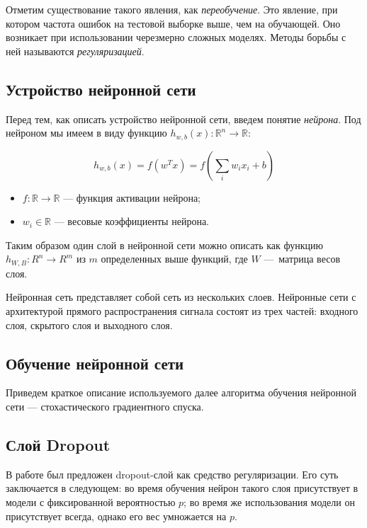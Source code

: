 \documentclass[14pt, a4paper]{extarticle}
\begin{document}
Отметим существование такого явления, как \textit{переобучение}. Это явление, при котором частота ошибок на тестовой выборке выше, чем на обучающей. Оно возникает при использовании черезмерно сложных моделях. Методы борьбы с ней называются \textit{регуляризацией}.

\subsection{Устройство нейронной сети}

Перед тем, как описать устройство нейронной сети, введем понятие \textit{нейрона}. Под нейроном мы имеем в виду функцию $h_{w, b}(x): \mathbb{R}^{n} \rightarrow \mathbb{R}$:

\begin{equation*}
	h_{w, b}(x) = f(w^Tx) = f(\sum_i w_ix_i + b)
\end{equation*}
\begin{itemize}
\item $f: \mathbb{R} \rightarrow \mathbb{R} $ — функция активации нейрона;
\item $w_i \in \mathbb{R} $ — весовые коэффициенты нейрона.
\end{itemize}

Таким образом один слой в нейронной сети можно описать как функцию $h_{W, B}: R^n \rightarrow R^m$ из $m$ определенных выше функций, где $W$ — матрица весов слоя.

Нейронная сеть представляет собой сеть из нескольких слоев. Нейронные сети с архитектурой прямого распространения сигнала состоят из трех частей: входного слоя, скрытого слоя и выходного слоя.

\subsection{Обучение нейронной сети}
Приведем краткое описание используемого далее алгоритма обучения нейронной сети — стохастического градиентного спуска.

\subsection{Слой Dropout}
В работе \cite{dropout} был предложен dropout-слой как средство регуляризации. Его суть заключается в следующем: во время обучения нейрон такого слоя присутствует в модели с фиксированной вероятностью $p$; во время же использования модели он присутствует всегда, однако его вес умножается на $p$.
 
\end{document}
